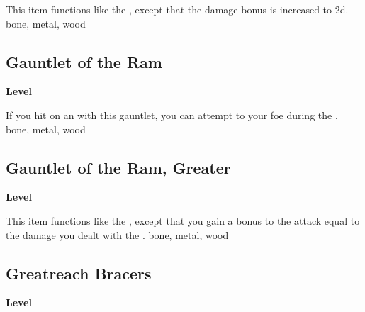 \vspace{-1.5em}  %
This item functions like the , except that the damage bonus is increased to \plus2d.
 
 bone, metal, wood
\begin{multicols}{2}
\lowercase{\hypertarget{item:Gauntlet of the Ram}{}}\label{item:Gauntlet of the Ram}
\hypertarget{item:Gauntlet of the Ram}{\subsection{Gauntlet of the Ram}}
\columnbreak%
\begin{flushright}
\large\textbf{ Level}
\end{flushright}
\end{multicols}
\vspace{-1.5em}  %
If you hit on an   with this gauntlet, you can attempt to  your foe during the .
 
 bone, metal, wood
\begin{multicols}{2}
\lowercase{\hypertarget{item:Gauntlet of the Ram, Greater}{}}\label{item:Gauntlet of the Ram, Greater}
\hypertarget{item:Gauntlet of the Ram, Greater}{\subsection{Gauntlet of the Ram, Greater}}
\columnbreak%
\begin{flushright}
\large\textbf{ Level}
\end{flushright}
\end{multicols}
\vspace{-1.5em}  %
This item functions like the , except that you gain a bonus to the  attack equal to the damage you dealt with the .
 
 bone, metal, wood
\begin{multicols}{2}
\lowercase{\hypertarget{item:Greatreach Bracers}{}}\label{item:Greatreach Bracers}
\hypertarget{item:Greatreach Bracers}{\subsection{Greatreach Bracers}}
\columnbreak%
\begin{flushright}
\large\textbf{ Level}
\end{flushright}
\end{multicols}
